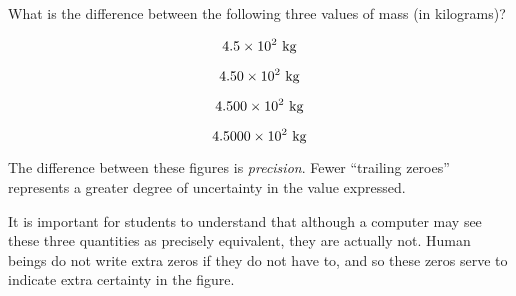 

What is the difference between the following three values of mass (in kilograms)?

$$4.5 \times 10^2 \hbox{ kg}$$

$$4.50 \times 10^2 \hbox{ kg}$$

$$4.500 \times 10^2 \hbox{ kg}$$

$$4.5000 \times 10^2 \hbox{ kg}$$







The difference between these figures is {\it precision}.  Fewer ``trailing zeroes'' represents a greater degree of uncertainty in the value expressed.







It is important for students to understand that although a computer may see these three quantities as precisely equivalent, they are actually not.  Human beings do not write extra zeros if they do not have to, and so these zeros serve to indicate extra certainty in the figure.




